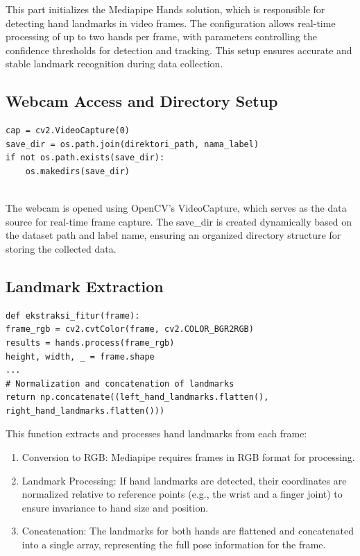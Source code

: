 This part initializes the Mediapipe Hands solution, which is responsible for detecting hand landmarks in video frames. The configuration allows real-time processing of up to two hands per frame, with parameters controlling the confidence thresholds for detection and tracking. This setup ensures accurate and stable landmark recognition during data collection.

\subsection{ Webcam Access and Directory Setup}

\begin{lstlisting}
cap = cv2.VideoCapture(0)
save_dir = os.path.join(direktori_path, nama_label)
if not os.path.exists(save_dir):
	os.makedirs(save_dir)
	
\end{lstlisting}

The webcam is opened using OpenCV’s VideoCapture, which serves as the data source for real-time frame capture. The save\_dir is created dynamically based on the dataset path and label name, ensuring an organized directory structure for storing the collected data.

\subsection{Landmark Extraction}
\begin{lstlisting}
def ekstraksi_fitur(frame):
frame_rgb = cv2.cvtColor(frame, cv2.COLOR_BGR2RGB)
results = hands.process(frame_rgb)
height, width, _ = frame.shape
...
# Normalization and concatenation of landmarks
return np.concatenate((left_hand_landmarks.flatten(), right_hand_landmarks.flatten()))

\end{lstlisting}

This function extracts and processes hand landmarks from each frame:
\begin{enumerate}
	\item Conversion to RGB: Mediapipe requires frames in RGB format for processing.
	\item Landmark Processing: If hand landmarks are detected, their coordinates are normalized relative to reference points (e.g., the wrist and a finger joint) to ensure invariance to hand size and position.
	\item Concatenation: The landmarks for both hands are flattened and concatenated into a single array, representing the full pose information for the frame.
\end{enumerate}

